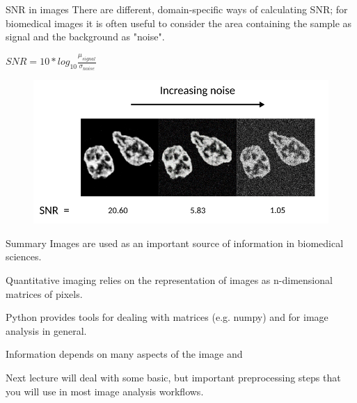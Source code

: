 \documentclass[9pt, aspectratio=169]{beamer}
\begin{document}
\begin{frame}
	{SNR in images}
	There are different, domain-specific ways of calculating SNR; for biomedical images it is often useful to consider the area containing the sample as signal and the background as "noise".

	\large
	$SNR = 10*log_{10}\frac{\mu_{signal}}{\sigma_{noise}}$
	\begin{figure}
		\centering
		\includegraphics[width=.8\textwidth]{noisyimage.png}
	\end{figure}
\end{frame}

\begin{frame}
	{Summary}
	Images are used as an important source of information in biomedical sciences.

	Quantitative imaging relies on the representation of images as n-dimensional matrices of pixels.

	Python provides tools for dealing with matrices (e.g. numpy) and for image analysis in general.

	Information depends on many aspects of the image and

	Next lecture will deal with some basic, but important preprocessing steps that you will use in most image analysis workflows.
\end{frame}
\end{document}
